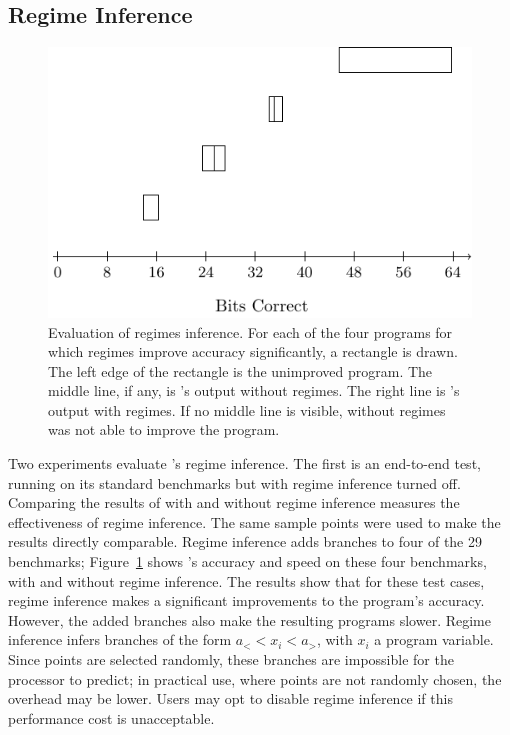 \documentclass[paper.tex]{subfiles}
\begin{document}
\subsection{Regime Inference} \label{sec:eval-regimes}

\begin{figure}
\includegraphics[width=0.9\columnwidth]{fig/eval-regimes-e2e.pdf}
\caption{Evaluation of regimes inference. For each of the four
  programs for which regimes improve accuracy significantly, a
  rectangle is drawn. The left edge of the rectangle is the unimproved
  program. The middle line, if any, is \casio's output without
  regimes. The right line is \casio's output with regimes. If no
  middle line is visible, \casio without regimes was not able to
  improve the program.}
\label{fig:eval-regimes-e2e}
\end{figure}


Two experiments evaluate \casio's regime inference.  The first is an
end-to-end test, running \casio on its standard benchmarks but with
regime inference turned off.
Comparing the results of \casio with and
without regime inference measures the effectiveness of regime
inference.
The same sample points were used to make the results directly comparable.
Regime inference adds branches to four of the 29
benchmarks; Figure~\ref{fig:eval-regimes-e2e} shows \casio's accuracy
and speed on these four benchmarks, with and without regime
inference.  The results show that for these test cases, regime
inference makes a significant improvements to the program's accuracy.
However, the added branches also make the resulting programs slower.
Regime inference infers branches of the form $a_< < x_i < a_>$, with
$x_i$ a program variable.
Since points are selected randomly, these branches are
impossible for the processor to predict;
in practical use, where points are not randomly chosen,
the overhead may be lower.
Users may opt to disable regime inference if this performance cost is unacceptable.
\end{document}
